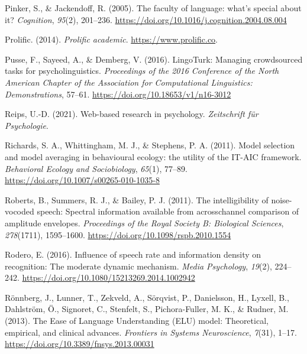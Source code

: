 \documentclass[a4paper, nobind]{templates/ociamthesis}
\newlength{\cslhangindent}
\newenvironment{CSLReferences}[2] %
 {%
  \setlength{\parindent}{0pt}
  \ifodd #1
  \let\oldpar\par
  \def\par{\hangindent=\cslhangindent\oldpar}
  \fi
  \setlength{\parskip}{1mm}
  \setlength{\baselineskip}{6mm}
 }%
 {}
\begin{document}
\begin{CSLReferences}{1}{0}
\leavevmode{}%
Pinker, S., \& Jackendoff, R. (2005). The faculty of language: what's special about it? \emph{Cognition}, \emph{95}(2), 201--236. \url{https://doi.org/10.1016/j.cognition.2004.08.004}

\leavevmode{}%
Prolific. (2014). \emph{Prolific academic}. \url{https://www.prolific.co}.

\leavevmode{}%
Pusse, F., Sayeed, A., \& Demberg, V. (2016). {LingoTurk: Managing crowdsourced tasks for psycholinguistics}. \emph{Proceedings of the 2016 Conference of the North American Chapter of the Association for Computational Linguistics: Demonstrations}, 57--61. \url{https://doi.org/10.18653/v1/n16-3012}

\leavevmode{}%
Reips, U.-D. (2021). Web-based research in psychology. \emph{Zeitschrift f{ü}r Psychologie}.

\leavevmode{}%
Richards, S. A., Whittingham, M. J., \& Stephens, P. A. (2011). Model selection and model averaging in behavioural ecology: the utility of the IT-AIC framework. \emph{Behavioral Ecology and Sociobiology}, \emph{65}(1), 77--89. \url{https://doi.org/10.1007/s00265-010-1035-8}

\leavevmode{}%
Roberts, B., Summers, R. J., \& Bailey, P. J. (2011). The intelligibility of noise-vocoded speech: Spectral information available from acrosschannel comparison of amplitude envelopes. \emph{Proceedings of the Royal Society B: Biological Sciences}, \emph{278}(1711), 1595--1600. \url{https://doi.org/10.1098/rspb.2010.1554}

\leavevmode{}%
Rodero, E. (2016). {Influence of speech rate and information density on recognition: The moderate dynamic mechanism}. \emph{Media Psychology}, \emph{19}(2), 224--242. \url{https://doi.org/10.1080/15213269.2014.1002942}

\leavevmode{}%
Rönnberg, J., Lunner, T., Zekveld, A., Sörqvist, P., Danielsson, H., Lyxell, B., Dahlström, Ö., Signoret, C., Stenfelt, S., Pichora-Fuller, M. K., \& Rudner, M. (2013). {The Ease of Language Understanding (ELU) model: Theoretical, empirical, and clinical advances}. \emph{Frontiers in Systems Neuroscience}, \emph{7}(31), 1--17. \url{https://doi.org/10.3389/fnsys.2013.00031}


\end{CSLReferences}
\end{document}
